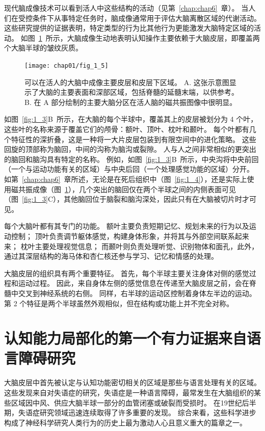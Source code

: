 现代脑成像技术可以看到活人中这些结构的活动（见第~\ref{chap:chap6}~章）。
当人们在受控条件下从事特定任务时，脑成像通常用于评估大脑离散区域的代谢活动。
这些研究提供的证据表明，特定类型的行为比其他行为更能激发大脑特定区域的活动。
如图~\ref{fig:1_5}~所示，大脑成像生动地表明认知操作主要依赖于大脑皮层，即覆盖两个大脑半球的皱纹灰质。


\begin{figure}[htbp]
	\centering
	\texttt{[image: chap01/fig\_1\_5]}
	\caption{可以在活人的大脑中成像主要皮层和皮层下区域。
		A. 这张示意图显示了大脑的主要表面和深部区域，包括脊髓的延髓末端，以供参考。
		B. 在 A 部分绘制的主要大脑分区在活人脑的磁共振图像中很明显。}
	\label{fig:1_5}
\end{figure}


如图~\ref{fig:1_3}B~所示，在大脑的每个半球中，覆盖其上的皮层被划分为 4 个叶，这些叶的名称来源于覆盖它们的颅骨：额叶、顶叶、枕叶和颞叶。
每个叶都有几个特征性的深折叠，这是一种将一大片皮层包装到有限空间中的进化策略。
这些回旋的顶部称为脑回，中间的沟称为脑沟或裂隙。 
人与人之间非常相似的更突出的脑回和脑沟具有特定的名称。
例如，如图~\ref{fig:1_3}B~所示，中央沟将中央前回（一个与运动功能有关的区域）与中央后回（一个处理感觉功能的区域）分开。
如第~\ref{chap:chap6}~章所述，无论是在死后组织中（图~\ref{fig:1_4}），还是实际上使用磁共振成像（图~\ref{fig:1_5}），几个突出的脑回仅在两个半球之间的内侧表面可见（图~\ref{fig:1_3}C），其他脑回位于脑裂和脑沟深处，因此只有在大脑被切片时才可见。


每个大脑叶都有其专门的功能。
额叶主要负责短期记忆、规划未来的行为以及运动控制；
顶叶负责调节躯体感觉，构建身体形象，并将其与外部空间联系起来来；
枕叶主要处理视觉信息；
而颞叶则负责处理听觉、识别物体和面孔，此外，通过其深层结构的海马体和杏仁核还参与学习、记忆和情感的处理。


大脑皮层的组织具有两个重要特征。
首先，每个半球主要关注身体对侧的感觉过程和运动过程。
因此，来自身体左侧的感觉信息在传递至大脑皮层之前，会在脊髓中交叉到神经系统的右侧。
同样，右半球的运动区控制着身体左半边的运动。
第 2 个特征是两个半球虽然外观相似，但在结构或功能上并不完全对称。



\section{认知能力局部化的第一个有力证据来自语言障碍研究}


大脑皮层中首先被认定与认知功能密切相关的区域是那些与语言处理有关的区域。
这些发现来自对失语症的研究，失语症是一种语言障碍，最常发生在大脑组织的某些区域因中风、供应大脑半球一部分的血管闭塞或破裂而受损时。
在19世纪后半期，失语症研究领域迅速连续取得了许多重要的发现。
综合来看，这些科学进步构成了神经科学研究人类行为的历史上最为激动人心且意义重大的篇章之一。


